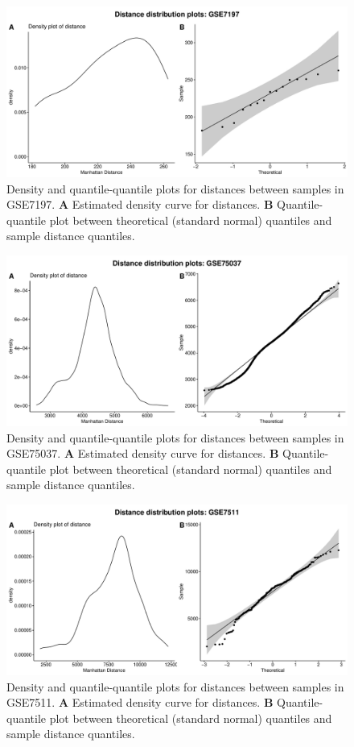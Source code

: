 \documentclass[10pt,letterpaper]{article}\usepackage[]{graphicx}\usepackage[]{color}
\begin{document}
\begin{figure}[H]
	\includegraphics[width=\textwidth]{manhattan-distance_hist_GSE7197.pdf}
	\caption{Density and quantile-quantile plots for distances between samples in GSE7197. \textbf{A} Estimated density curve for distances. \textbf{B} Quantile-quantile plot between theoretical (standard normal) quantiles and sample distance quantiles.}
\end{figure}

\begin{figure}[H]
	\includegraphics[width=\textwidth]{manhattan-distance_hist_GSE75037.pdf}
	\caption{Density and quantile-quantile plots for distances between samples in GSE75037. \textbf{A} Estimated density curve for distances. \textbf{B} Quantile-quantile plot between theoretical (standard normal) quantiles and sample distance quantiles.}
\end{figure}

\begin{figure}[H]
	\includegraphics[width=\textwidth]{manhattan-distance_hist_GSE7511.pdf}
	\caption{Density and quantile-quantile plots for distances between samples in GSE7511. \textbf{A} Estimated density curve for distances. \textbf{B} Quantile-quantile plot between theoretical (standard normal) quantiles and sample distance quantiles.}
\end{figure}
\end{document}

